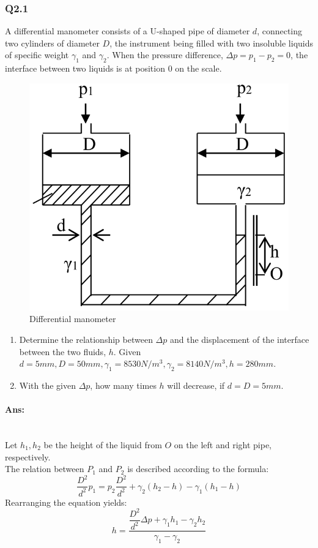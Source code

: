 \subsubsection{Q2.1}
A differential manometer consists of a U-shaped pipe of diameter $ d $, connecting two cylinders of diameter $ D $, the  instrument being filled with two insoluble liquids of specific weight $ \gamma_1 $ and $ \gamma_2  $. When the pressure difference, $ \Delta p = p_1-p_2 =0$, the interface between two liquids is at position $ 0 $ on the scale.
\begin{figure}[h]
	\centering
	\includegraphics[width=0.4\linewidth]{"2020-08-13 17.00.35 drive.google.com c4c67da5f09f"}
	\caption{Differential manometer}
	\label{fig:2020-08-13-17}
\end{figure}
\begin{enumerate}
	\item Determine the relationship between $ \Delta p $ and the displacement of the interface between the two fluids, $ h $. Given $ d=5\unit{mm},D=50\unit{mm}, \gamma_1=8530\unit{N/m^3},\gamma_2=8140\unit{N/m^3}, h=280\unit{mm}$.
	\item With the given $ \Delta p $, how many times $ h $ will decrease, if $ d=D=5\unit{mm} $.
\end{enumerate}
\paragraph{Ans:}$  $\\
Let $ h_1,h_2 $ be the height of the liquid from $ O $ on the left and right pipe, respectively.\\
The relation between $ P_1 $ and $ P_2 $ is described according to the formula:
\[\dfrac{D^2}{d^2}p_1=p_2\dfrac{D^2}{d^2}+\gamma_2(h_2-h)-\gamma_1(h_1-h)\]
Rearranging the equation yields:
\[h=\dfrac{\dfrac{D^2}{d^2}\Delta p +\gamma_1h_1-\gamma_2h_2}{\gamma_1-\gamma_2}\]

